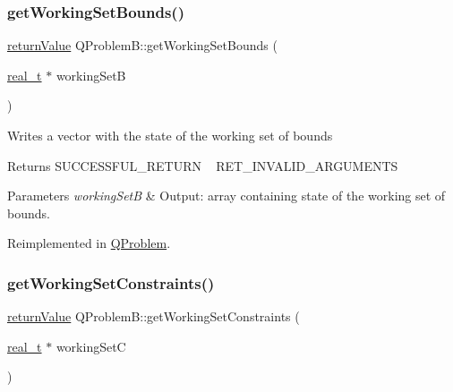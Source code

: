 \mbox{\label{class_q_problem_b_a317183ae1f862863ac5b50e0c4028227}} 
\subsubsection{\texorpdfstring{get\+Working\+Set\+Bounds()}{getWorkingSetBounds()}}
{\footnotesize\ttfamily \hyperlink{_message_handling_8hpp_a81d556f613bfbabd0b1f9488c0fa865e}{return\+Value} Q\+Problem\+B\+::get\+Working\+Set\+Bounds (\begin{DoxyParamCaption}\item[{\hyperlink{qp_o_a_s_e_s__wrapper_8h_a0d00e2b3dfadee81331bbb39068570c4}{real\+\_\+t} $\ast$}]{working\+SetB }\end{DoxyParamCaption})\hspace{0.3cm}{\ttfamily [virtual]}}

Writes a vector with the state of the working set of bounds \begin{DoxyReturn}{Returns}
S\+U\+C\+C\+E\+S\+S\+F\+U\+L\+\_\+\+R\+E\+T\+U\+RN ~\newline
 R\+E\+T\+\_\+\+I\+N\+V\+A\+L\+I\+D\+\_\+\+A\+R\+G\+U\+M\+E\+N\+TS 
\end{DoxyReturn}

\begin{DoxyParams}{Parameters}
{\em working\+SetB} & Output\+: array containing state of the working set of bounds. \\
\hline
\end{DoxyParams}


Reimplemented in \hyperlink{class_q_problem_a23949497794759135cd63d2bc5dc297a}{Q\+Problem}.

\mbox{\label{class_q_problem_b_aa4b108a056ac2a35bf3938d1ca18f1cc}} 
\subsubsection{\texorpdfstring{get\+Working\+Set\+Constraints()}{getWorkingSetConstraints()}}
{\footnotesize\ttfamily \hyperlink{_message_handling_8hpp_a81d556f613bfbabd0b1f9488c0fa865e}{return\+Value} Q\+Problem\+B\+::get\+Working\+Set\+Constraints (\begin{DoxyParamCaption}\item[{\hyperlink{qp_o_a_s_e_s__wrapper_8h_a0d00e2b3dfadee81331bbb39068570c4}{real\+\_\+t} $\ast$}]{working\+SetC }\end{DoxyParamCaption})\hspace{0.3cm}{\ttfamily [virtual]}}

